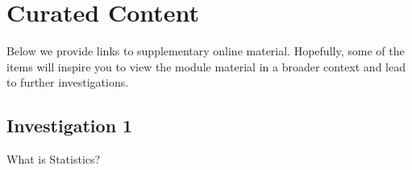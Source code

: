 \documentclass[
  a4paper,
  DIV=11,
  numbers=noendperiod,
  oneside]{scrreprt}
\theoremstyle{plain}
\theoremstyle{definition}
\theoremstyle{definition}
\theoremstyle{definition}
\theoremstyle{plain}
\theoremstyle{remark}
\begin{document}
\endgroup

\cleardoublepage
{}
{}
\appendix

\chapter*{Curated Content}\label{curated-content}


Below we provide links to supplementary online material. Hopefully, some
of the items will inspire you to view the module material in a broader
context and lead to further investigations.

\section*{Investigation 1}\label{investigation-1}


What is Statistics?
\end{document}
